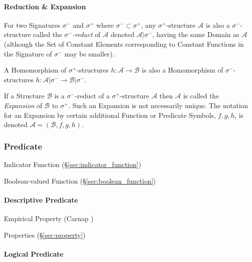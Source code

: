 \paragraph{Reduction \& Expansion}\label{sec:reduct_expansion}\hfill

For two Signatures $\sigma^-$ and $\sigma^+$ where $\sigma^- \subset
\sigma^+$, any $\sigma^+$-structure $\mathcal{A}$ is also a
$\sigma^-$-structure called the \emph{$\sigma^-$-reduct} of
$\mathcal{A}$ denoted $\mathcal{A}|\sigma^-$, having the same Domain
as $\mathcal{A}$ (although the Set of Constant Elements corresponding
to Constant Functions in the Signature of $\sigma^-$ may be smaller).

A Homomorphism of $\sigma^+$-structures $h : \mathcal{A} \rightarrow
\mathcal{B}$ is also a Homomorphism of $\sigma^-$-structures $h :
\mathcal{A} | \sigma^- \rightarrow \mathcal{B} | \sigma^-$.

If a Structure $\mathcal{B}$ is a $\sigma^-$-reduct of a
$\sigma^+$-structure $\mathcal{A}$ then $\mathcal{A}$ is called the
\emph{Expansion} of $\mathcal{B}$ to $\sigma^+$. Such an Expansion is
not necessarily unique. The notation for an Expansion by certain
additional Function or Predicate Symbols, $f, g, h$, is denoted
$\mathcal{A} = (\mathcal{B}, f, g, h)$.



\subsubsection{Predicate}\label{sec:predicate}

Indicator Function (\S\ref{sec:indicator_function})

Boolean-valued Function (\S\ref{sec:boolean_function})



\paragraph{Descriptive Predicate}\label{sec:descriptive_predicate}\hfill

Empirical Property (Carnap \cite{carnap59})

Properties (\S\ref{sec:property})



\paragraph{Logical Predicate}\label{sec:logical_predicate}\hfill



